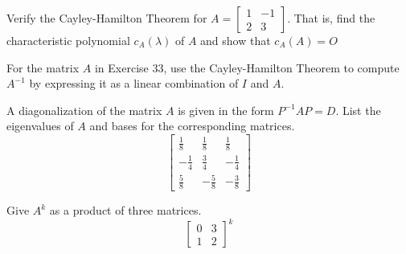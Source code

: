 \documentclass[12pt,letterpaper]{hmcpset}
\begin{document}
\newpage

\begin{problem}[4.3.33]
    Verify the Cayley-Hamilton Theorem for $A=\begin{bmatrix}
    1 & -1 \\ 
    2 & 3
    \end{bmatrix} $. That is, find the characteristic polynomial $c_A(\lambda)$ of $A$ and show that $c_A(A) = O$
\end{problem}

\begin{solution}
    \vfill
\end{solution}

\newpage

\begin{problem}[4.3.37]
    For the matrix $A$ in Exercise 33, use the Cayley-Hamilton Theorem to compute $A^{-1}$ by expressing it as a linear combination of $I$ and $A$.
\end{problem}

\begin{solution}
    \vfill
\end{solution}

\newpage

\begin{problem}[4.4.7]
    A diagonalization of the matrix $A$ is given in the form $P^{-1}AP=D$. List the eigenvalues of $A$ and bases for the corresponding matrices.
    \[
    \begin{bmatrix}
    \frac{1}{8} & \frac{1}{8} & \frac{1}{8} \\ 
    -\frac{1}{4} & \frac{3}{4} & -\frac{1}{4} \\ 
    \frac{5}{8} & -\frac{5}{8} & -\frac{3}{8}
    \end{bmatrix} 
    \]
\end{problem}

\begin{solution}
    \vfill
\end{solution}

\newpage

\begin{problem}[4.4.19]
    Give $A^k$ as a product of three matrices.
    \[
    \begin{bmatrix}
    0 & 3 \\ 
    1 & 2
    \end{bmatrix}^k
    \]
\end{problem}
\end{document}

